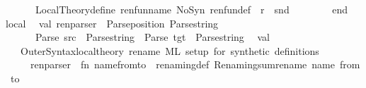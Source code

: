 \begin{isabellebody}
\ \ \ \ \ \ Local{\isacharunderscore}{\kern0pt}Theory{\isachardot}{\kern0pt}define\ {\isacharparenleft}{\kern0pt}{\isacharparenleft}{\kern0pt}ren{\isacharunderscore}{\kern0pt}fun{\isacharunderscore}{\kern0pt}name{\isacharcomma}{\kern0pt}\ NoSyn{\isacharparenright}{\kern0pt}{\isacharcomma}{\kern0pt}\ {\isacharparenleft}{\kern0pt}{\isacharparenleft}{\kern0pt}ren{\isacharunderscore}{\kern0pt}fun{\isacharunderscore}{\kern0pt}def{\isacharcomma}{\kern0pt}\ {\isacharbrackleft}{\kern0pt}{\isacharbrackright}{\kern0pt}{\isacharparenright}{\kern0pt}{\isacharcomma}{\kern0pt}\ r{\isacharparenright}{\kern0pt}{\isacharparenright}{\kern0pt}\ {\isacharbar}{\kern0pt}{\isachargreater}{\kern0pt}\ snd\ \ \ \ \ \ \isanewline
\ \ end{\isacharsemicolon}{\kern0pt}\isanewline
{\isacartoucheclose}\isanewline
\isanewline
{}\isamarkupfalse%
{\isacartoucheopen}\isanewline
local\isanewline
\isanewline
\ \ val\ ren{\isacharunderscore}{\kern0pt}parser\ {\isacharequal}{\kern0pt}\ Parse{\isachardot}{\kern0pt}position\ {\isacharparenleft}{\kern0pt}Parse{\isachardot}{\kern0pt}string\ {\isacharminus}{\kern0pt}{\isacharminus}{\kern0pt}\isanewline
\ \ \ \ \ \ {\isacharparenleft}{\kern0pt}Parse{\isachardot}{\kern0pt}{\isachardollar}{\kern0pt}{\isachardollar}{\kern0pt}{\isachardollar}{\kern0pt}\ {\isachardoublequote}{\kern0pt}src{\isachardoublequote}{\kern0pt}\ {\isacharbar}{\kern0pt}{\isacharminus}{\kern0pt}{\isacharminus}{\kern0pt}\ Parse{\isachardot}{\kern0pt}string\ {\isacharminus}{\kern0pt}{\isacharminus}{\kern0pt}{\isacharbar}{\kern0pt}\ Parse{\isachardot}{\kern0pt}{\isachardollar}{\kern0pt}{\isachardollar}{\kern0pt}{\isachardollar}{\kern0pt}\ {\isachardoublequote}{\kern0pt}tgt{\isachardoublequote}{\kern0pt}\ {\isacharminus}{\kern0pt}{\isacharminus}{\kern0pt}\ Parse{\isachardot}{\kern0pt}string{\isacharparenright}{\kern0pt}{\isacharparenright}{\kern0pt}{\isacharsemicolon}{\kern0pt}\isanewline
\isanewline
\ \ val\ {\isacharunderscore}{\kern0pt}\ {\isacharequal}{\kern0pt}\isanewline
\ \ \ Outer{\isacharunderscore}{\kern0pt}Syntax{\isachardot}{\kern0pt}local{\isacharunderscore}{\kern0pt}theory\ \isactrlcommandUNDERSCOREkeyword {\isasymopen}rename{\isasymclose}\ {\isachardoublequote}{\kern0pt}ML\ setup\ for\ synthetic\ definitions{\isachardoublequote}{\kern0pt}\isanewline
\ \ \ \ \ {\isacharparenleft}{\kern0pt}ren{\isacharunderscore}{\kern0pt}parser\ {\isachargreater}{\kern0pt}{\isachargreater}{\kern0pt}\ {\isacharparenleft}{\kern0pt}fn\ {\isacharparenleft}{\kern0pt}{\isacharparenleft}{\kern0pt}name{\isacharcomma}{\kern0pt}{\isacharparenleft}{\kern0pt}from{\isacharcomma}{\kern0pt}to{\isacharparenright}{\kern0pt}{\isacharparenright}{\kern0pt}{\isacharcomma}{\kern0pt}{\isacharunderscore}{\kern0pt}{\isacharparenright}{\kern0pt}\ {\isacharequal}{\kern0pt}{\isachargreater}{\kern0pt}\ renaming{\isacharunderscore}{\kern0pt}def\ Renaming{\isachardot}{\kern0pt}sum{\isacharunderscore}{\kern0pt}rename\ name\ from\ to\ {\isacharparenright}{\kern0pt}{\isacharparenright}{\kern0pt}\isanewline

\end{isabellebody}
